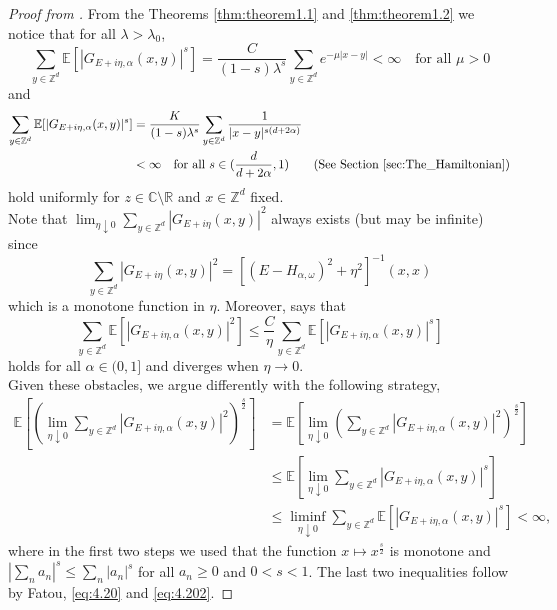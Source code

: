\documentclass[11pt, a4paper, UKenglish, oneside]{book}
\theoremstyle{plain}
\theoremstyle{remark}
\theoremstyle{definition}
\numberwithin{equation}{section}
\numberwithin{theorem}{section}
\begin{document}
\begin{proof}[Proof from \cite{disertori2024}]
    From the Theorems \ref{thm:theorem1.1} and \ref{thm:theorem1.2} we notice that for all $\lambda>\lambda_0$,
    \begin{equation}
        \sum_{y \in \mathbb{Z}^d} \mathbb{E}[|G_{E+i\eta,\alpha}(x,y)|^s] = \frac{C}{(1-s)\lambda^s} \sum_{y \in \mathbb{Z}^d} e^{-\mu |x-y|} < \infty \quad \text{for all }\mu>0 \label{eq:4.20}
    \end{equation}
    and
    \begin{align}\label{eq:4.202}
        \sum_{y \in \mathbb{Z}^d} \mathbb{E}[|G_{E+i\eta,\alpha}(x,y)|^s] &= \frac{K}{(1-s)\lambda^{s}} \sum_{y \in \mathbb{Z}^d} \frac{1}{|x-y|^{s(d+2\alpha)}} \\ \nonumber
        &< \infty \quad \text{for all } s \in (\frac{d}{d+2\alpha},1) \qquad \text{(See Section \ref{sec:The_Hamiltonian})}
    \end{align} 
    hold uniformly for $z \in \mathbb{C} \setminus \mathbb{R}$ and $x \in \mathbb{Z}^d$ fixed.\\
    Note that $\lim_{\eta \downarrow 0} \sum_{y \in \mathbb{Z}^d} |G_{E+i\eta}(x,y)|^2$ always exists (but may be infinite) since $$\sum_{y \in \mathbb{Z}^d} |G_{E+i\eta}(x,y)|^2 = [(E-H_{\alpha,\omega})^2 + \eta^2]^{-1}(x,x)$$ which is a monotone function in $\eta$.
    Moreover, \cite[Proposition 5.1]{stolz2011} says that  $$\sum_{y \in \mathbb{Z}^d} \mathbb{E}[|G_{E+i\eta,\alpha}(x,y)|^2] \le \frac{C}{\eta} \sum_{y \in \mathbb{Z}^d} \mathbb{E}[|G_{E+i\eta,\alpha}(x,y)|^s]$$ holds for all $\alpha \in (0,1]$ and  diverges when $\eta \rightarrow 0$.\\
    Given these obstacles, we argue differently with the following strategy,
    \begin{align*}
        \mathbb{E}\left[ \left( \lim_{\eta \downarrow 0} \sum_{y \in \mathbb{Z}^{d}} |G_{E+i\eta,\alpha}(x,y)|^{2} \right)^{\frac{s}{2}} \right] 
        &= \mathbb{E}\left[ \lim_{\eta \downarrow 0} \left( \sum_{y \in \mathbb{Z}^{d}} |G_{E+i\eta,\alpha}(x,y)|^{2} \right)^{\frac{s}{2}} \right] \\
        &\le \mathbb{E}\left[ \lim_{\eta \downarrow 0} \sum_{y \in \mathbb{Z}^{d}} |G_{E+i\eta,\alpha}(x,y)|^{s} \right] \\
        &\le \liminf_{\eta \downarrow 0} \sum_{y \in \mathbb{Z}^{d}} \mathbb{E}[|G_{E+i\eta,\alpha}(x,y)|^{s}] < \infty,
    \end{align*}
    where in the first two steps we used that the function $x \mapsto x^{\frac{s}{2}}$ is monotone and $\left|\sum_{n} a_{n}\right|^{s} \le \sum_{n} |a_{n}|^{s}$ for all $a_{n} \ge 0$ and $0 < s < 1$. The last two inequalities follow by Fatou, \eqref{eq:4.20} and \eqref{eq:4.202}. 
\end{proof}
\end{document}
